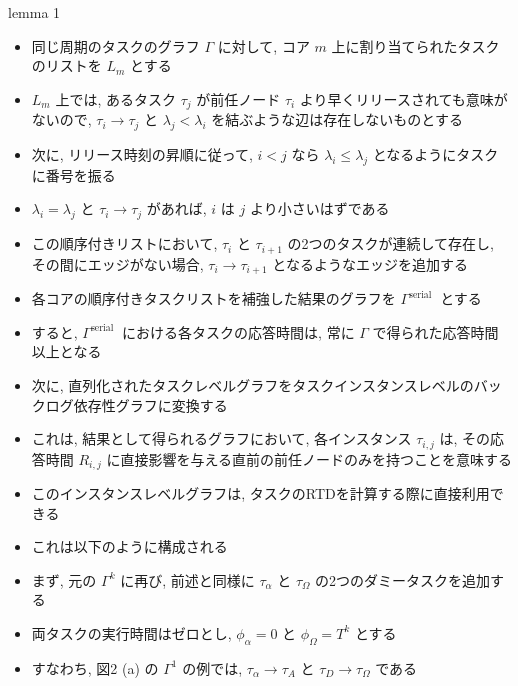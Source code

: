 \begin{frame}[label=lemma1]{lemma 1}
    \begin{lemma}[直列化]
        \begin{itemize}
            \item 同じ周期のタスクのグラフ $\Gamma$ に対して, コア $m$ 上に割り当てられたタスクのリストを $L_{m}$ とする
\item $L_{m}$ 上では, あるタスク $\tau_{j}$ が前任ノード $\tau_{i}$ より早くリリースされても意味がないので, $\tau_{i} \rightarrow \tau_{j}$ と $\lambda_{j}<\lambda_{i}$ を結ぶような辺は存在しないものとする
\item 次に, リリース時刻の昇順に従って, $i<j$ なら $\lambda_{i} \leq \lambda_{j}$ となるようにタスクに番号を振る
\item $\lambda_{i}=\lambda_{j}$ と $\tau_{i} \rightarrow \tau_{j}$ があれば, $i$ は $j$ より小さいはずである
\item この順序付きリストにおいて, $\tau_{i}$ と $\tau_{i+1}$ の2つのタスクが連続して存在し, その間にエッジがない場合, $\tau_{i} \rightarrow \tau_{i+1}$ となるようなエッジを追加する
\item 各コアの順序付きタスクリストを補強した結果のグラフを $\Gamma^{\text {serial }}$ とする
\item すると, $\Gamma^{\text {serial }}$ における各タスクの応答時間は, 常に $\Gamma$ で得られた応答時間以上となる
        \end{itemize}
    \end{lemma}
\end{frame}

\begin{frame}{}
    \begin{itemize}
        \item 次に, 直列化されたタスクレベルグラフをタスクインスタンスレベルのバックログ依存性グラフに変換する
\item これは, 結果として得られるグラフにおいて, 各インスタンス $\tau_{i, j}$ は, その応答時間 $R_{i, j}$ に直接影響を与える直前の前任ノードのみを持つことを意味する
\item このインスタンスレベルグラフは, タスクのRTDを計算する際に直接利用できる
\item これは以下のように構成される
    \end{itemize}
\end{frame}

\begin{frame}{}
    \begin{itemize}
        \item まず, 元の $\Gamma^{k}$ に再び, 前述と同様に $\tau_{\alpha}$ と $\tau_{\Omega}$ の2つのダミータスクを追加する
\item 両タスクの実行時間はゼロとし, $\phi_{\alpha}=0$ と $\phi_{\Omega}=T^{k}$ とする
\item すなわち, 図2 (a) の $\Gamma^{1}$ の例では, $\tau_{\alpha} \rightarrow \tau_{A}$ と $\tau_{D} \rightarrow \tau_{\Omega}$ である
    \end{itemize}
\end{frame}

